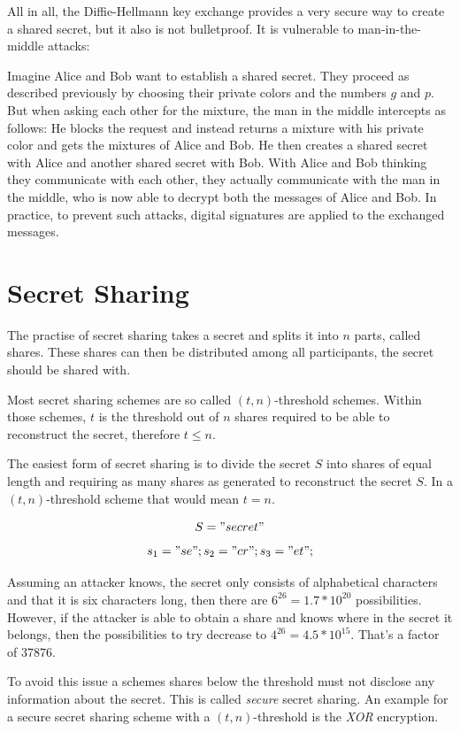 All in all, the Diffie-Hellmann key exchange provides a very secure way
to create a shared secret, but it also is not bulletproof. It is vulnerable
to man-in-the-middle attacks:

Imagine Alice and Bob want to establish a shared secret. They proceed as
described previously by choosing their private colors and the numbers $g$
and $p$. But when asking each other for the mixture, the man in the middle
intercepts as follows: He blocks the request and instead returns a mixture
with his private color and gets the mixtures of Alice and Bob. He then
creates a shared secret with Alice and another shared secret with Bob. With
Alice and Bob thinking they communicate with each other, they actually
communicate with the man in the middle, who is now able to decrypt both
the messages of Alice and Bob. In practice, to prevent such attacks, digital
signatures are applied to the exchanged messages.

\section{Secret Sharing}

The practise of secret sharing takes a secret and splits it into $n$ parts,
called shares. These shares can then be distributed among all participants, the
secret should be shared with.

Most secret sharing schemes are so called $(t, n)$-threshold schemes. Within
those schemes, $t$ is the threshold out of $n$ shares required to be able to
reconstruct the secret, therefore $t \leq n$.

The easiest form of secret sharing is to divide the secret $S$ into shares of
equal length and requiring as many shares as generated to reconstruct the
secret $S$. In a $(t, n)$-threshold scheme that would mean $t = n$.

$$S = "secret"$$
$$s_1 = "se"; s_2 = "cr"; s_3 = "et";$$

Assuming an attacker knows, the secret only consists of alphabetical characters
and that it is six characters long, then there are $6^{26} = 1.7 * 10^{20}$
possibilities.  However, if the attacker is able to obtain a share and knows
where in the secret it belongs, then the possibilities to try decrease to
$4^{26} = 4.5 * 10^{15}$. That's a factor of $37876$.

To avoid this issue a schemes shares below the threshold must not disclose any
information about the secret. This is called \textit{secure} secret sharing.
An example for a secure secret sharing scheme with a $(t, n)$-threshold is the
\textit{XOR} encryption.

